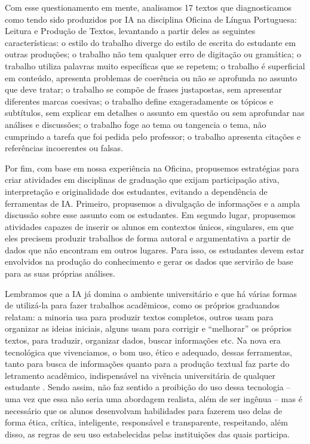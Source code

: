 \documentclass[portuguese]{textolivre}
\begin{document}
Com esse questionamento em mente, analisamos 17 textos que diagnosticamos como tendo sido produzidos por IA na disciplina Oficina de Língua Portuguesa: Leitura e Produção de Textos, levantando a partir deles as seguintes características: o estilo do trabalho diverge do estilo de escrita do estudante em outras produções; o trabalho não tem qualquer erro de digitação ou gramática; o trabalho utiliza palavras muito específicas que se repetem; o trabalho é superficial em conteúdo, apresenta problemas de coerência ou não se aprofunda no assunto que deve tratar; o trabalho se compõe de frases justapostas, sem apresentar diferentes marcas coesivas; o trabalho define exageradamente os tópicos e subtítulos, sem explicar em detalhes o assunto em questão ou sem aprofundar nas análises e discussões; o trabalho foge ao tema ou tangencia o tema, não cumprindo a tarefa que foi pedida pelo professor; o trabalho apresenta citações e referências incoerentes ou falsas.

Por fim, com base em nossa experiência na Oficina, propusemos estratégias para criar atividades em disciplinas de graduação que exijam participação ativa, interpretação e originalidade dos estudantes, evitando a dependência de ferramentas de IA. Primeiro, propusemos a divulgação de informações e a ampla discussão sobre esse assunto com os estudantes. Em segundo lugar, propusemos atividades capazes de inserir os alunos em contextos únicos, singulares, em que eles precisem produzir trabalhos de forma autoral e argumentativa a partir de dados que não encontram em outros lugares. Para isso, os estudantes devem estar envolvidos na produção do conhecimento e gerar os dados que servirão de base para as suas próprias análises.

Lembramos que a IA já domina o ambiente universitário e que há várias formas de utilizá-la para fazer trabalhos acadêmicos, como os próprios graduandos relatam: a minoria usa para produzir textos completos, outros usam para organizar as ideias iniciais, alguns usam para corrigir e ``melhorar'' os próprios textos, para traduzir, organizar dados, buscar informações etc. Na nova era tecnológica que vivenciamos, o bom uso, ético e adequado, dessas ferramentas, tanto para busca de informações quanto para a produção textual faz parte do letramento acadêmico, indispensável na vivência universitária de qualquer estudante \cite{amaral2025}. Sendo assim, não faz sentido a proibição do uso dessa tecnologia -- uma vez que essa não seria uma abordagem realista, além de ser ingênua -- mas é necessário que os alunos desenvolvam habilidades para fazerem uso delas de forma ética, crítica, inteligente, responsável e transparente, respeitando, além disso, as regras de seu uso estabelecidas pelas instituições das quais participa.
\end{document}
